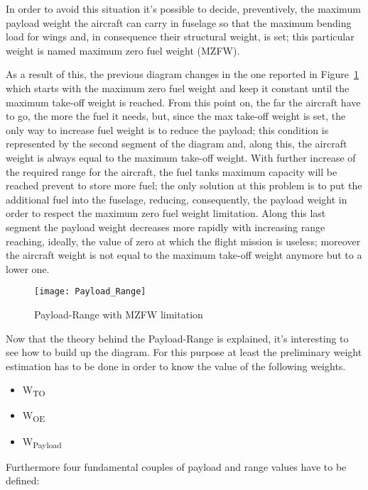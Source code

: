 In order to avoid this situation it’s possible to decide, preventively, the maximum payload weight the aircraft can carry in fuselage so that the maximum bending load for wings and, in consequence their structural weight, is set; this particular weight is named maximum zero fuel weight (MZFW).

As a result of this, the previous diagram changes in the one reported in Figure~\ref{fig:Figure2} which starts with the maximum zero fuel weight and keep it constant until the maximum take-off weight is reached. From this point on, the far the aircraft have to go, the more the fuel it needs, but, since the max take-off weight is set, the only way to increase fuel weight is to reduce the payload; this condition is represented by the second segment of the diagram and, along this, the aircraft weight is always equal to the maximum take-off weight. With further increase of the required range for the aircraft, the fuel tanks maximum capacity will be reached prevent to store more fuel; the only solution at this problem is to put the additional fuel into the fuselage, reducing, consequently, the payload weight in order to respect the maximum zero fuel weight limitation. Along this last segment the payload weight decreases more rapidly with increasing range reaching, ideally, the value of zero at which the flight mission is useless; moreover the aircraft weight is not equal to the maximum take-off weight anymore but to a lower one.

\bigskip
\begin{figure}[ht]
\centering
\texttt{[image: Payload\_Range]}
\caption{Payload-Range with MZFW limitation}
\label{fig:Figure2}
\end{figure}

\bigskip
Now that the theory behind the Payload-Range is explained, it’s interesting to see how to build up the diagram. For this purpose at least the preliminary weight estimation has to be done in order to know the value of the following weights.

\begin{itemize}
\item W\textsubscript{TO}
\item W\textsubscript{OE}
\item W\textsubscript{Payload}
\end{itemize}

\noindent 
Furthermore four fundamental couples of payload and range values have to be defined:

